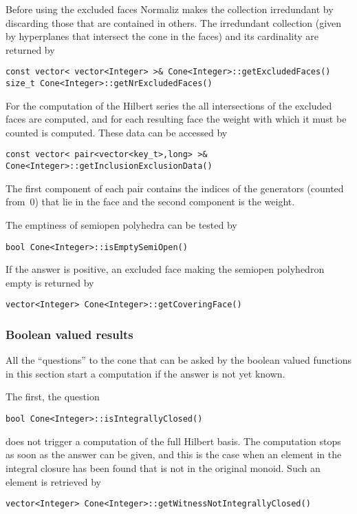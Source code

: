 \documentclass[12pt,a4paper]{scrartcl}
\theoremstyle{definition}
\begin{document}
\begin{small}
Before using the excluded faces Normaliz makes the collection irredundant by discarding those that are contained in others. The irredundant collection (given by hyperplanes that intersect the cone in the faces) and its cardinality are returned by
\begin{Verbatim}
const vector< vector<Integer> >& Cone<Integer>::getExcludedFaces()
size_t Cone<Integer>::getNrExcludedFaces()
\end{Verbatim}
For the computation of the Hilbert series the all intersections of the excluded faces are computed, and for each resulting face the weight with which it must be counted is computed. These data can be accessed by
\begin{Verbatim}
const vector< pair<vector<key_t>,long> >& Cone<Integer>::getInclusionExclusionData()
\end{Verbatim}
The first component of each pair contains the indices of the generators (counted from~$0$) that lie in the face and the second component is the weight.

The emptiness of semiopen polyhedra can be tested by
\begin{Verbatim}
bool Cone<Integer>::isEmptySemiOpen()
\end{Verbatim}
If the answer is positive, an excluded face making the semiopen polyhedron empty is returned by
\begin{Verbatim}
vector<Integer> Cone<Integer>::getCoveringFace() 
\end{Verbatim}

\subsubsection{Boolean valued results}

All the ``questions'' to the cone that can be asked by the boolean valued functions in this section start a computation if the answer is not yet known.

The first, the question
\begin{Verbatim}
bool Cone<Integer>::isIntegrallyClosed()
\end{Verbatim}
does not trigger a computation of the full Hilbert basis. The computation stops as soon as the answer can be given, and this is the case when an element in the integral closure has been found that is not in the original monoid. Such an element is retrieved by
\begin{Verbatim}
vector<Integer> Cone<Integer>::getWitnessNotIntegrallyClosed()
\end{Verbatim}


\end{small}
\end{document}
